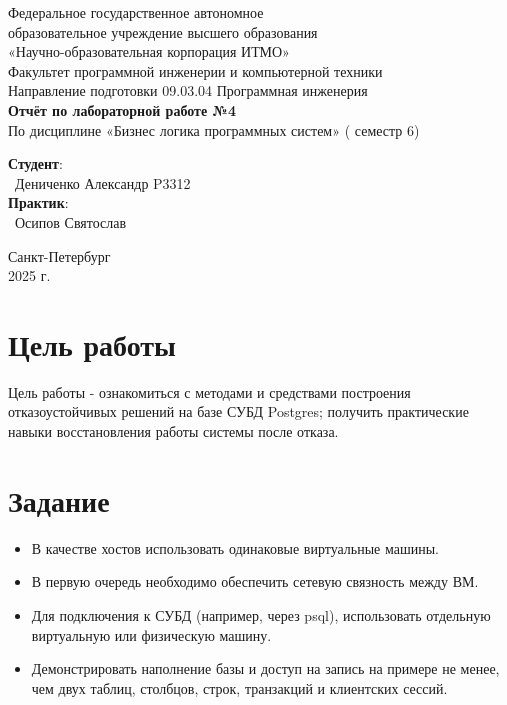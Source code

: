 \documentclass{article}
\begin{document}
\begin{center}
    \Large
    Федеральное государственное автономное \\
    образовательное учреждение высшего образования \\ 
    «Научно-образовательная корпорация ИТМО»\\
    \vspace{0.5cm}
    \large
    Факультет программной инженерии и компьютерной техники \\
    Направление подготовки 09.03.04 Программная инженерия \\
    \vspace{1cm}
    \Large
    \textbf{Отчёт по лабораторной работе №4} \\
        По дисциплине «Бизнес логика программных систем» ( семестр 6)\\
    \large
    \vspace{8cm}

    \begin{minipage}{.33\textwidth}
    \end{minipage}
    \hfill
    \begin{minipage}{.4\textwidth}
    
        \textbf{Студент}: \vspace{.1cm} \\
        \ Дениченко Александр P3312\\
        \textbf{Практик}:  \\
        \ Осипов Святослав
    \end{minipage}
    \vfill
Санкт-Петербург\\ 2025 г.
\end{center}
\pagestyle{empty}
\newpage
\pagestyle{plain}

\section*{Цель работы}
Цель работы - ознакомиться с методами и средствами построения отказоустойчивых решений на базе СУБД Postgres; получить практические навыки восстановления работы системы после отказа.

\section*{Задание}

\begin{itemize}
    \item В качестве хостов использовать одинаковые виртуальные машины.
    \item В первую очередь необходимо обеспечить сетевую связность между ВМ.
    \item Для подключения к СУБД (например, через psql), использовать отдельную виртуальную или физическую машину.
    \item Демонстрировать наполнение базы и доступ на запись на примере не менее, чем двух таблиц, столбцов, строк, транзакций и клиентских сессий.
\end{itemize}
\end{document}
